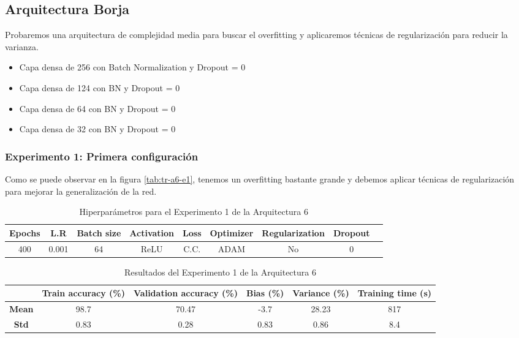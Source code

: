 \documentclass{article}
\begin{document}
    \subsection{Arquitectura Borja}
			Probaremos una arquitectura de complejidad media para buscar el overfitting y aplicaremos t\'ecnicas de regularizaci\'on para reducir la varianza. 
			\begin{itemize}
			    \item Capa densa de 256 con Batch Normalization y Dropout = 0
                \item Capa densa de 124 con BN y Dropout = 0
                \item Capa densa de 64 con BN y Dropout = 0
                \item Capa densa de 32 con BN y Dropout = 0
			\end{itemize}
		\subsubsection{Experimento 1: Primera configuraci\'on}
        \label{s-a6-e1}
            Como se puede observar en la figura \ref{tab:tr-a6-e1}, tenemos un overfitting bastante grande y debemos aplicar t\'ecnicas de regularizaci\'on para mejorar la generalizaci\'on de la red. 
            \begin{table}[!h]
				\begin{tabular}{|c|c|c|c|c|c|c|c|c|}
					\textbf{Epochs}&\textbf{L.R}&\textbf{Batch size}&\textbf{Activation}&\textbf{Loss}&\textbf{Optimizer}&\textbf{Regularization}&\textbf{Dropout}   \\ \hline
					400 & 0.001 & 64 & ReLU & C.C. & ADAM & No & 0 
				\end{tabular}
				\caption{Hiperpar\'ametros para el Experimento 1 de la Arquitectura 6}
				\label{tab:hip-a6-e1}
			\end{table}
   
            \begin{table}[!h]
				\begin{center}
					\begin{tabular}{ c | c | c | c | c | c |}
						\ & \textbf{Train accuracy (\%)} & \textbf{Validation accuracy (\%)} & \textbf{Bias (\%)} & \textbf{Variance (\%)} & \textbf{Training time (s)} \\ \hline
						\textbf{Mean} & 98.7 & 70.47 & -3.7  & 28.23 & 817   \\ \hline
						\textbf{Std} &  0.83 & 0.28 &  0.83 & 0.86 & 8.4  \\ \hline
					\end{tabular}
					\caption{Resultados del Experimento 1 de la Arquitectura 6}
					\label{tab:res-a2-e5}
				\end{center}
			\end{table}
            
\end{document}
